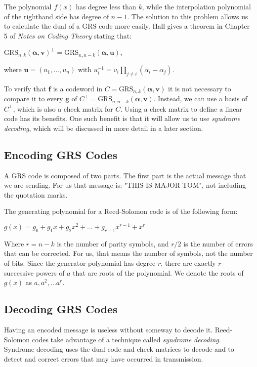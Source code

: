 \documentclass{article}
\begin{document}
The polynomial $f(x)$ has degree less than $k$, while the interpolation polynomial of the righthand side has degree of $n - 1$. The solution to this problem allows us to calculate the dual of a GRS code more easily. Hall gives a theorem in Chapter 5 of \textit{Notes on Coding Theory} stating that:
\begin{center}
$\text{GRS}_{n,k}(\boldsymbol\alpha, \textbf{v})^{\perp} = \text{GRS}_{n,n - k}(\boldsymbol\alpha, \textbf{u})$,
\end{center}
where $\textbf{u} = (u_{1},...,u_{n}) \text{ with } u_{i}^{-1} = v_{i}\prod\limits_{j \neq i} (\alpha_{i} - \alpha_{j})$.

To verify that $\textbf{f}$ is a codeword in $C = \text{GRS}_{n,k}(\boldsymbol\alpha, \textbf{v})$ it is not necessary to compare it to every $\textbf{g} \text{ of } C^{\perp} = \text{GRS}_{n,n-k}(\boldsymbol\alpha, \textbf{v})$. Instead, we can use a basis of $C^{\perp}$, which is also a check matrix for $C$. Using a check matrix to define a linear code has its benefits. One such benefit is that it will allow us to use \textit{syndrome decoding}, which will be discussed in more detail in a later section.

\subsection{Encoding GRS Codes}
A GRS code is composed of two parts. The first part is the actual message that we are sending. For us that message is: "THIS IS MAJOR TOM", not including the quotation marks.

The generating polynomial for a Reed-Solomon code is of the following form:
\begin{center}
$g(x) = g_{0} + g_{1}x + g_{2}x^{2} + ... + g_{r - 1}x^{r - 1} + x^{r}$
\end{center}
Where $r = n - k$ is the number of parity symbols, and $r/2$ is the number of errors that can be corrected. For us, that means the number of symbols, not the number of bits. Since the generator polynomial has degree $r$, there are exactly $r$ successive powers of $a$ that are roots of the polynomial. We denote the roots of $g(x)$ as $a, a^{2},...a^{r}$.

\subsection{Decoding GRS Codes}
Having an encoded message is useless without someway to decode it. Reed-Solomon codes take advantage of a technique called \textit{syndrome decoding}. Syndrome decoding uses the dual code and check matrices to decode and to detect and correct errors that may have occurred in transmission. 
\end{document}
